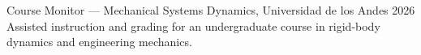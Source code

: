 \cvsection{\ExperienceLabel}

\cvexperience
{Course Monitor --- Mechanical Systems Dynamics, Universidad de los Andes}
{2026}
{Assisted instruction and grading for an undergraduate course in rigid-body dynamics and engineering mechanics.}